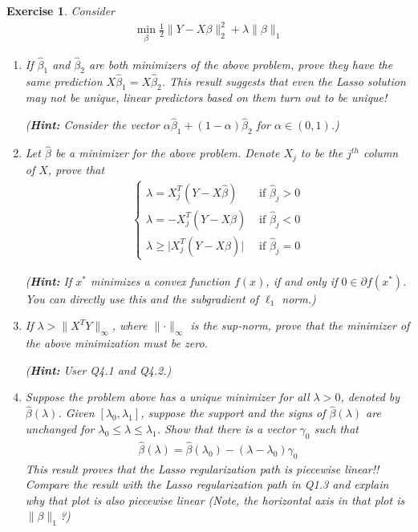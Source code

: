 \documentclass[12pt]{article}
\theoremstyle{colon}
\newtheorem{exercise}{Exercise}
\begin{document}
\clearpage

\begin{exercise}
  Consider
  \begin{gather*}
    \min_\beta \frac{1}{2} \lVert Y - X \beta \rVert_2^2 + \lambda \lVert \beta \rVert_1
  \end{gather*}
  \begin{enumerate}[label=\arabic*)]
    \item If $\widehat{\beta}_1$ and $\widehat{\beta}_2$ are both minimizers of the above problem, prove they have the same prediction $X \widehat{\beta}_1 = X \widehat{\beta}_2$. This result suggests that even the Lasso solution may not be unique, linear predictors based on them turn out to be unique!

      (\textbf{Hint:} Consider the vector $\alpha \widehat{\beta}_1 + (1-\alpha) \widehat{\beta}_2$ for $\alpha \in (0,1)$.)

    \item Let $\widehat{\beta}$ be a minimizer for the above problem. Denote $X_j$ to be the $j^{th}$ column of $X$, prove that
      \begin{gather*}
        \begin{cases}
          \lambda = X_j^T(Y - X \widehat{\beta}) & \text{ if } \widehat{\beta}_j > 0 \\
          \lambda = -X_j^T(Y - X \widehat{\beta}) & \text{ if } \widehat{\beta}_j < 0 \\
          \lambda \geq \lvert X_j^T(Y - X \widehat{\beta}) \rvert & \text{ if } \widehat{\beta}_j = 0
        \end{cases}
      \end{gather*}

      (\textbf{Hint:} If $x^*$ minimizes a convex function $f(x)$, if and only if $0 \in \partial f(x^*)$. You can directly use this and the subgradient of $\ell_1$ norm.)

    \item If $\lambda > \lVert X^T Y \rVert_\infty$, where $\lVert \cdot \rVert_\infty$ is the sup-norm, prove that the minimizer of the above minimization must be zero.

      (\textbf{Hint:} User Q4.1 and Q4.2.)

    \item Suppose the problem above has a unique minimizer for all $\lambda > 0$, denoted by $\widehat{\beta}(\lambda)$. Given $[\lambda_0, \lambda_1]$, suppose the support and the signs of $\widehat{\beta}(\lambda)$ are unchanged for $\lambda_0 \leq \lambda \leq \lambda_1$. Show that there is a vector $\gamma_0$ such that
      \begin{gather*}
        \widehat{\beta}(\lambda) = \widehat{\beta}(\lambda_0) - (\lambda - \lambda_0)\gamma_0
      \end{gather*}
      This result proves that the Lasso regularization path is piecewise linear!! Compare the result with the Lasso regularization path in Q1.3 and explain why that plot is also piecewise linear (Note, the horizontal axis in that plot is $\lVert \beta \rVert_1$?)


\end{enumerate}
\end{exercise}
\end{document}
